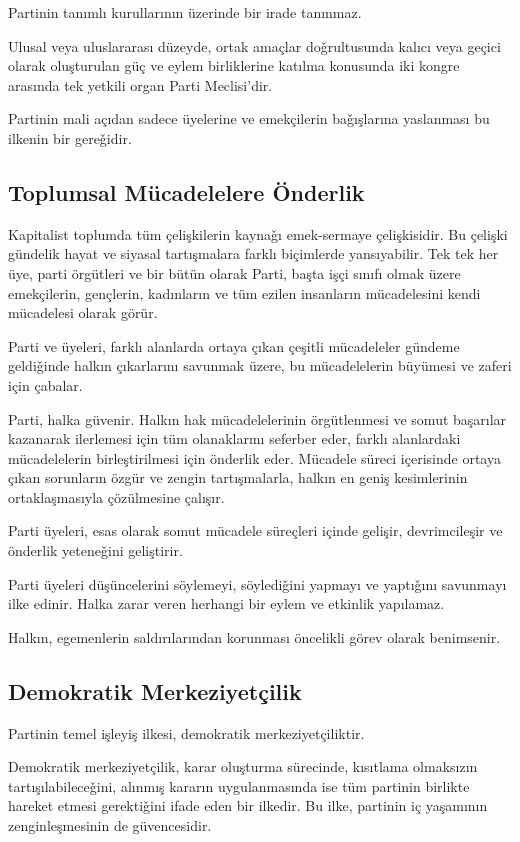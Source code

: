 \documentclass[11pt]{article} %
\begin{document}
Partinin tanımlı kurullarının üzerinde bir irade tanınmaz.

Ulusal veya uluslararası düzeyde, ortak amaçlar doǧrultusunda kalıcı veya geçici olarak oluşturulan güç ve eylem birliklerine katılma konusunda iki kongre arasında tek yetkili organ Parti Meclisi’dir.

Partinin mali açıdan sadece üyelerine ve emekçilerin baǧışlarına yaslanması bu
ilkenin bir gereǧidir.
\subsection{Toplumsal Mücadelelere Önderlik}
Kapitalist toplumda tüm çelişkilerin kaynaǧı emek-sermaye çelişkisidir. Bu çelişki gündelik hayat ve siyasal tartışmalara farklı biçimlerde yansıyabilir. Tek tek her üye, parti örgütleri ve bir bütün olarak Parti, başta işçi sınıfı olmak üzere emekçilerin, gençlerin, kadınların ve tüm ezilen insanların mücadelesini kendi mücadelesi olarak görür.

Parti ve üyeleri, farklı alanlarda ortaya çıkan çeşitli mücadeleler gündeme geldiǧinde halkın çıkarlarını savunmak üzere, bu mücadelelerin büyümesi ve zaferi için çabalar.

Parti, halka güvenir. Halkın hak mücadelelerinin örgütlenmesi ve somut başarılar kazanarak ilerlemesi için tüm olanaklarını seferber eder, farklı alanlardaki mücadelelerin birleştirilmesi için önderlik eder. Mücadele süreci içerisinde ortaya çıkan sorunların özgür ve zengin tartışmalarla, halkın en geniş kesimlerinin ortaklaşmasıyla çözülmesine çalışır.

Parti üyeleri, esas olarak somut mücadele süreçleri içinde gelişir, devrimcileşir ve
önderlik yeteneǧini geliştirir.

Parti üyeleri düşüncelerini söylemeyi, söylediǧini yapmayı ve yaptıǧını savunmayı
ilke edinir. Halka zarar veren herhangi bir eylem ve etkinlik yapılamaz.

Halkın, egemenlerin saldırılarından korunması öncelikli görev olarak benimsenir.

\subsection{Demokratik Merkeziyetçilik}
Partinin temel işleyiş ilkesi, demokratik merkeziyetçiliktir.

Demokratik merkeziyetçilik, karar oluşturma sürecinde, kısıtlama olmaksızın tartışılabileceǧini, alınmış kararın uygulanmasında ise tüm partinin birlikte hareket etmesi gerektiǧini ifade eden bir ilkedir. Bu ilke, partinin iç yaşamının zenginleşmesinin de güvencesidir.
\end{document}
